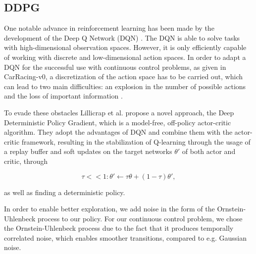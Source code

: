 \documentclass[letterpaper, 10 pt, conference]{ieeeconf}  %
\begin{document}
\subsection{DDPG}
One notable advance in reinforcement learning has been made by the development of the Deep Q Network (DQN) \cite{mnih2015humanlevel}. The DQN is able to solve tasks with high-dimensional observation spaces. However, it is only efficiently capable of working with discrete and low-dimensional action spaces. In order to adapt a DQN for the successful use with continuous control problems, as given in CarRacing-v0, a discretization of the action space has to be carried out, which can lead to two main difficulties: an explosion in the number of possible actions and the loss of important information \cite{lillicrapContinuousControlDeep2015}.

To evade these obstacles Lillicrap et al. propose a novel approach, the Deep Deterministic Policy Gradient, which is a model-free, off-policy actor-critic algorithm. They adopt the advantages of DQN and combine them with the actor-critic framework, resulting in the stabilization of Q-learning through the usage of a replay buffer and soft updates on the target networks $\theta'$ of both actor and critic, through

\begin{equation}
\tau << 1:\theta' \leftarrow \tau\theta + (1-\tau)\theta',
\end{equation}

as well as finding a deterministic policy.

In order to enable better exploration, we add noise in the form of the Ornstein-Uhlenbeck process to our policy. For our continuous control problem, we chose the Ornstein-Uhlenbeck process due to the fact that it produces temporally correlated noise, which enables smoother transitions, compared to e.g. Gaussian noise. 
\end{document}
